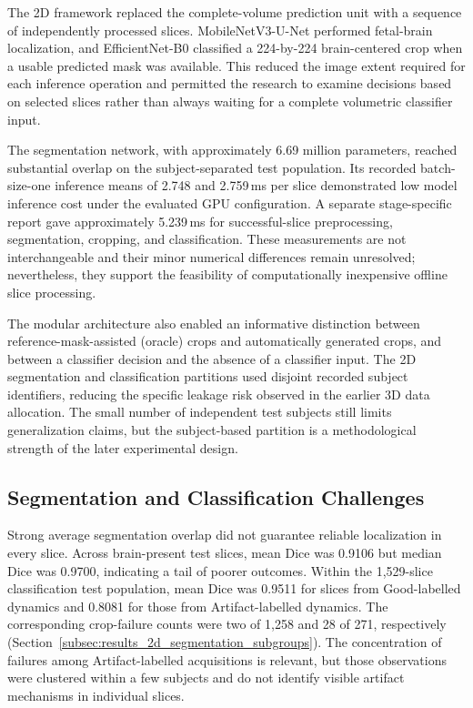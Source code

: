 The 2D framework replaced the complete-volume prediction unit with a sequence of independently processed slices. MobileNetV3-U-Net performed fetal-brain localization, and EfficientNet-B0 classified a 224-by-224 brain-centered crop when a usable predicted mask was available. This reduced the image extent required for each inference operation and permitted the research to examine decisions based on selected slices rather than always waiting for a complete volumetric classifier input.

The segmentation network, with approximately 6.69 million parameters, reached substantial overlap on the subject-separated test population. Its recorded batch-size-one inference means of 2.748 and 2.759\,ms per slice demonstrated low model inference cost under the evaluated GPU configuration. A separate stage-specific report gave approximately 5.239\,ms for successful-slice preprocessing, segmentation, cropping, and classification. These measurements are not interchangeable and their minor numerical differences remain unresolved; nevertheless, they support the feasibility of computationally inexpensive offline slice processing.

The modular architecture also enabled an informative distinction between reference-mask-assisted (oracle) crops and automatically generated crops, and between a classifier decision and the absence of a classifier input. The 2D segmentation and classification partitions used disjoint recorded subject identifiers, reducing the specific leakage risk observed in the earlier 3D data allocation. The small number of independent test subjects still limits generalization claims, but the subject-based partition is a methodological strength of the later experimental design.

\subsection{Segmentation and Classification Challenges}
\label{subsec:discussion_2d_challenges}

Strong average segmentation overlap did not guarantee reliable localization in every slice. Across brain-present test slices, mean Dice was 0.9106 but median Dice was 0.9700, indicating a tail of poorer outcomes. Within the 1,529-slice classification test population, mean Dice was 0.9511 for slices from Good-labelled dynamics and 0.8081 for those from Artifact-labelled dynamics. The corresponding crop-failure counts were two of 1,258 and 28 of 271, respectively (Section~\ref{subsec:results_2d_segmentation_subgroups}). The concentration of failures among Artifact-labelled acquisitions is relevant, but those observations were clustered within a few subjects and do not identify visible artifact mechanisms in individual slices.

